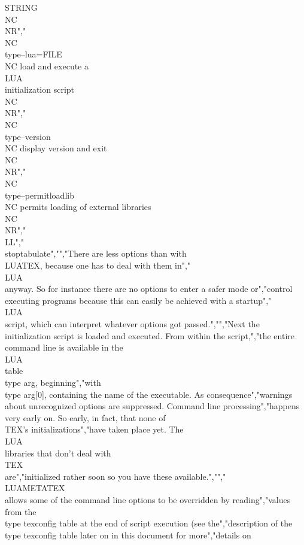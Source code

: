 {STRING} \\NC \\NR","\\NC \\type{--lua=FILE}       \\NC load and execute a \\LUA\\ initialization script \\NC\\NR","\\NC \\type{--version}        \\NC display version and exit \\NC \\NR","\\NC \\type{--permitloadlib}  \\NC permits loading of external libraries \\NC \\NR","\\LL","\\stoptabulate","","There are less options than with \\LUATEX, because one has to deal with them in","\\LUA\\ anyway. So for instance there are no options to enter a safer mode or","control executing programs because this can easily be achieved with a startup","\\LUA\\ script, which can interpret whatever options got passed.","","Next the initialization script is loaded and executed. From within the script,","the entire command line is available in the \\LUA\\ table \\type {arg}, beginning","with \\type {arg[0]}, containing the name of the executable. As consequence","warnings about unrecognized options are suppressed. Command line processing","happens very early on. So early, in fact, that none of \\TEX's initializations","have taken place yet. The \\LUA\\ libraries that don't deal with \\TEX\\ are","initialized rather soon so you have these available.","","\\LUAMETATEX\\ allows some of the command line options to be overridden by reading","values from the \\type {texconfig} table at the end of script execution (see the","description of the \\type {texconfig} table later on in this document for more","details on 
